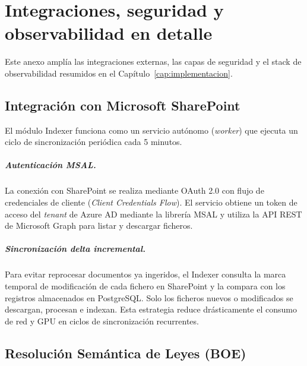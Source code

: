 \chapter{Integraciones, seguridad y observabilidad en detalle}
\label{anexo:integraciones}

Este anexo amplía las integraciones externas, las capas de seguridad y el stack de observabilidad resumidos en el Capítulo~\ref{cap:implementacion}.

\section{Integración con Microsoft SharePoint}
\label{anexo:sharepoint}

El módulo Indexer funciona como un servicio autónomo (\textit{worker}) que ejecuta un ciclo de sincronización periódica cada 5 minutos.

\paragraph{Autenticación MSAL.} La conexión con SharePoint se realiza mediante OAuth 2.0 con flujo de credenciales de cliente (\textit{Client Credentials Flow}). El servicio obtiene un token de acceso del \textit{tenant} de Azure AD mediante la librería MSAL y utiliza la API REST de Microsoft Graph \cite{msgraph2024docs} para listar y descargar ficheros.

\paragraph{Sincronización delta incremental.} Para evitar reprocesar documentos ya ingeridos, el Indexer consulta la marca temporal de modificación de cada fichero en SharePoint y la compara con los registros almacenados en PostgreSQL. Solo los ficheros nuevos o modificados se descargan, procesan e indexan. Esta estrategia reduce drásticamente el consumo de red y GPU en ciclos de sincronización recurrentes.

\section{Resolución Semántica de Leyes (BOE)}
\label{anexo:boe}

